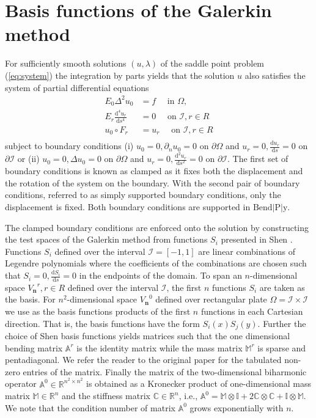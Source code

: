 \documentclass{marine_2015}
\newcommand{\Vh}{\ensuremath{V_{\mathbf{n}}}}
\newcommand{\deriv}[2]{\ensuremath{\frac{\mathrm{d}#1}{\mathrm{d}#2}}}
\newcommand{\tderiv}[2]{\ensuremath{\tfrac{\mathrm{d}#1}{\mathrm{d}#2}}}
\begin{document}
\section{Basis functions of the Galerkin method}
\label{sec:basis}
For sufficiently smooth solutions $\left(u, \lambda\right)$ of the saddle point
problem (\ref{eq:system}) the integration by parts yields that the solution $u$ also
satisfies the system of partial differential equations
\[
  \begin{aligned}
    E_0\Delta^2u_0 &= f\quad\text{ in }\Omega,\\
    E_r\deriv{^4 u_r}{s^4} &= 0\quad\text{ on }\mathcal{I}, r\in R\\
    u_0 \circ F_r&= u_r\quad\text{ on }\mathcal{I}, r\in R\\
  \end{aligned}
\]
subject to boundary conditions (i) $u_0=0, \partial_n u_0=0$ on $\partial\Omega $ and 
$u_r=0, \tderiv{u_r}{s}=0$ on $\partial\mathcal{I}$
or (ii) $u_0=0, \Delta u_0=0$ on $\partial\Omega$ and $u_r=0, \tderiv{^2u_r}{s^2}=0$ on
$\partial\mathcal{I}$. The first set of boundary conditions is known as clamped as
it fixes both the displacement and the rotation of the system on the boundary.
With the second pair of boundary conditions, referred to as simply supported boundary 
conditions, only the displacement is fixed. Both boundary conditions are supported 
in $\text{Bend}\!\left|\text{P}\right|\!\text{y}$. 

The clamped boundary conditions are enforced onto the solution by constructing
the test spaces of the Galerkin method from functions $S_i$ presented in Shen
\cite{shenpaper}. Functions $S_i$ defined over the interval
$\mathcal{I}=\left[-1, 1\right]$ are linear combinations of Legendre
polynomials where the coefficients of the combinations are chosen such that
$S_i=0, \tderiv{S_i}{s}=0$ in the endpoints of the domain. To span an $n$-dimensional 
space $\Vh^r, r\in R$ defined over the interval $\mathcal{I}$, the first 
$n$ functions $S_i$ are taken as the basis. For $n^2$-dimensional space $\Vh^0$ 
defined over rectangular plate $\Omega=\mathcal{I}\times\mathcal{I}$ we use as the 
basis functions products of the first $n$ functions in each Cartesian
direction. That is, the basis functions have the form $S_i\left(x\right)S_j\left(y\right)$. 
Further the choice of Shen basis functions yields matrices such that the one 
dimensional bending matrix $\mathbb{A}^r$ is the identity matrix while the mass 
matrix $\mathbb{M}^r$ is sparse and pentadiagonal. We refer the reader to the original paper \cite{shenpaper} 
for the tabulated non-zero entries of the matrix. Finally the matrix of the two-dimensional 
biharmonic operator $\mathbb{A}^0\in\mathbb{R}^{n^2\times n^2}$ is obtained
as a Kronecker product of one-dimensional mass matrix $\mathbb{M}\in\mathbb{R}^n$ and 
the stiffness matrix $\mathbb{C}\in\mathbb{R}^n$, i.e., $\mathbb{A}^0 = \mathbb{M}\otimes\mathbb{I} + 
2\mathbb{C}\otimes\mathbb{C} + \mathbb{I}\otimes\mathbb{M}$. We note that the
condition number of matrix $\mathbb{A}^0$ grows exponentially with $n$.
\end{document}
